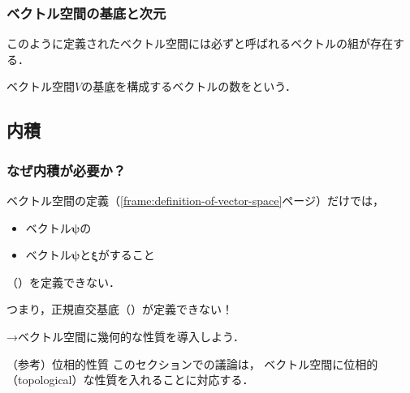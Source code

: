 \documentclass[
    10pt,
    ]{sotsu-beamer}
\begin{document}
\begin{frame}
    \frametitle{ベクトル空間の基底と次元}

    このように定義されたベクトル空間には必ずと呼ばれるベクトルの組が存在する．
    
    ベクトル空間$V$の基底を構成するベクトルの数をという．

\end{frame}


\subsection{内積}

\begin{frame}
    \frametitle{なぜ内積が必要か？}

    ベクトル空間の定義（\ref{frame:definition-of-vector-space}ページ）だけでは，
    \begin{itemize}
        \item ベクトル$\symbf{\psi}$の
        \item ベクトル$\symbf{\psi}$と$\symbf{\xi}$がすること
    \end{itemize}
    （）を定義できない．

    \pause

    つまり，\alert{正規直交基底（）が定義できない！}

    →ベクトル空間に幾何的な性質を導入しよう．

    \begin{block}{（参考）位相的性質}
        このセクションでの議論は，
        ベクトル空間に位相的（topological）な性質を入れることに対応する．
    \end{block}

\end{frame}
\end{document}
